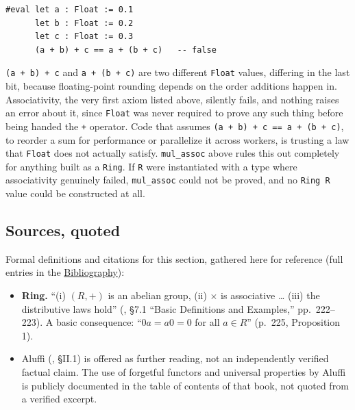 \begin{lstlisting}
#eval let a : Float := 0.1
      let b : Float := 0.2
      let c : Float := 0.3
      (a + b) + c == a + (b + c)   -- false
\end{lstlisting}

\texttt{(a + b) + c} and \texttt{a + (b + c)} are two different \texttt{Float} values, differing in the last bit, because floating-point rounding depends on the order additions happen in. Associativity, the very first axiom listed above, silently fails, and nothing raises an error about it, since \texttt{Float} was never required to prove any such thing before being handed the \texttt{+} operator. Code that assumes \texttt{(a + b) + c == a + (b + c)}, to reorder a sum for performance or parallelize it across workers, is trusting a law that \texttt{Float} does not actually satisfy. \texttt{mul\_\allowbreak{}assoc} above rules this out completely for anything built as a \texttt{Ring}. If \texttt{R} were instantiated with a type where associativity genuinely failed, \texttt{mul\_\allowbreak{}assoc} could not be proved, and no \texttt{Ring R} value could be constructed at all.

\subsection{Sources, quoted}\label{sec:09-rings:03-ring:2}

Formal definitions and citations for this section, gathered here for reference (full entries in the \hyperref[sec:root:bibliography:1]{Bibliography}):

\begin{itemize}
\tightlist
\item
  \textbf{Ring.} ``(i) \((R, +)\) is an abelian group, (ii) \(\times\) is associative \ldots{} (iii) the distributive laws hold'' (\cite{DummitFoote2003}, §7.1 ``Basic Definitions and Examples,'' pp.~222--223). A basic consequence: ``\(0a = a0 = 0\) for all \(a \in R\)'' (p.~225, Proposition 1).
\item
  Aluffi (\cite{Aluffi2009}, §II.1) is offered as further reading, not an independently verified factual claim. The use of forgetful functors and universal properties by Aluffi is publicly documented in the table of contents of that book, not quoted from a verified excerpt.
\end{itemize}
